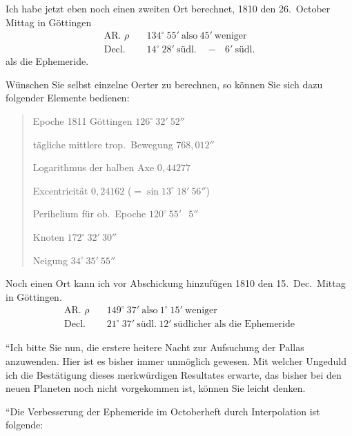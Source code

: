 \documentclass[12pt,a4paper]{book}
\begin{document}
Ich habe jetzt eben noch einen zweiten Ort berechnet, 1810 den 26.~October Mittag in G\"ottingen
\begin{align*}
\text{AR. }\rho &\quad 134^{\circ}\ 55'\ \text{also}\ 45'\ \text{weniger} \\
\text{Decl.} &\quad 14^{\circ}\ 28'\ \text{s\"udl.}\quad {-}\ \phantom{0}6'\ \text{s\"udl.}
\end{align*}
als die Ephemeride.

W\"unschen Sie selbst einzelne Oerter zu berechnen, so k\"onnen Sie sich dazu folgender Elemente bedienen:

\begin{quote}
Epoche 1811 G\"ottingen \dotfill $126^{\circ}\ 32'\ 52''$

t\"agliche mittlere trop.~Bewegung \dotfill $768{,}012''$

Logarithmus der halben Axe \dotfill $0{,}44277$

Excentricit\"at \dotfill $0{,}24162$ ($=\sin 13^{\circ}\ 18'\ 56''$)

Perihelium f\"ur ob.~Epoche \dotfill $120^{\circ}\ 55'\ \phantom{0}5''$

Knoten \dotfill $172^{\circ}\ 32'\ 30''$

Neigung \dotfill $34^{\circ}\ 35'\ 55''$
\end{quote}

Noch einen Ort kann ich vor Abschickung hinzuf\"ugen 1810 den 15.~Dec.\ Mittag in G\"ottingen.
\begin{align*}
\text{AR. }\rho &\quad 149^{\circ}\ 37'\ \text{also}\ 1^{\circ}\ 15'\ \text{weniger} \\
\text{Decl.} &\quad 21^{\circ}\ 37'\ \text{s\"udl.}\ 12'\ \text{s\"udlicher als die Ephemeride}
\end{align*}

``Ich bitte Sie nun, die erstere heitere Nacht zur Aufsuchung der Pallas anzuwenden. Hier ist es bisher immer unm\"oglich gewesen. Mit welcher Ungeduld ich die Best\"atigung dieses merkw\"urdigen Resultates erwarte, das bisher bei den neuen Planeten noch nicht vorgekommen ist, k\"onnen Sie leicht denken.

``Die Verbesserung der Ephemeride im Octoberheft durch Interpolation ist folgende:
\end{document}
